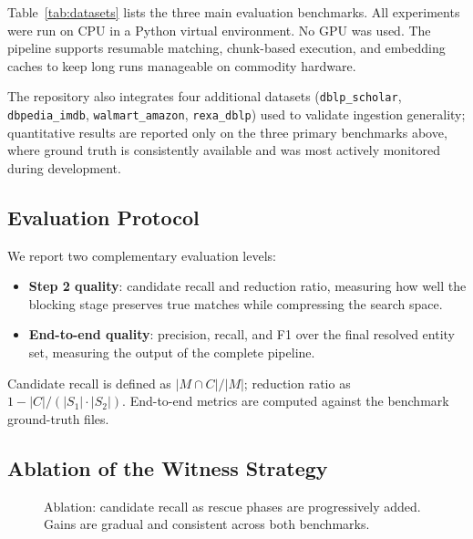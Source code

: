 \documentclass[10pt,twocolumn]{article}
\begin{document}
Table~\ref{tab:datasets} lists the three main evaluation benchmarks. All
experiments were run on CPU in a Python virtual environment. No GPU was used.
The pipeline supports resumable matching, chunk-based execution, and
embedding caches to keep long runs manageable on commodity hardware.

The repository also integrates four additional datasets
(\texttt{dblp\_scholar}, \texttt{dbpedia\_imdb}, \texttt{walmart\_amazon},
\texttt{rexa\_dblp}) used to validate ingestion generality; quantitative
results are reported only on the three primary benchmarks above, where
ground truth is consistently available and was most actively monitored
during development.

\subsection{Evaluation Protocol}

We report two complementary evaluation levels:
\begin{itemize}
  \item \textbf{Step 2 quality}: candidate recall and reduction ratio,
    measuring how well the blocking stage preserves true matches while
    compressing the search space.
  \item \textbf{End-to-end quality}: precision, recall, and F1 over the
    final resolved entity set, measuring the output of the complete pipeline.
\end{itemize}

Candidate recall is defined as $|M \cap C| / |M|$; reduction ratio as
$1 - |C| / (|S_1|\cdot|S_2|)$. End-to-end metrics are computed against
the benchmark ground-truth files.

\subsection{Ablation of the Witness Strategy}

\begin{figure}[t]
\centering
{}
\caption{Ablation: candidate recall as rescue phases are progressively added.
  Gains are gradual and consistent across both benchmarks.}
\label{fig:ablationgraph}
\end{figure}
\end{document}
